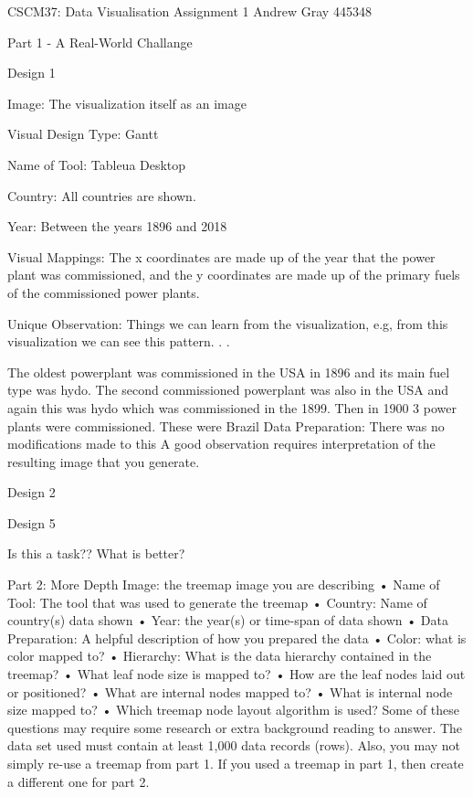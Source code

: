 CSCM37: Data Visualisation
Assignment 1
Andrew Gray
445348


Part 1 - A Real-World Challange 


Design 1

Image: The visualization itself as an image
 
Visual Design Type: Gantt

Name of Tool: Tableua Desktop

Country: All countries are shown.

Year: Between the years 1896 and 2018

Visual Mappings: The x coordinates are made up of the year that the power plant was commissioned, and the y coordinates are made up of the primary fuels of the commissioned power plants. 



Unique Observation: Things we can learn from the visualization, e.g, from this visualization we can see this pattern. . .

The oldest powerplant was commissioned in the USA in 1896 and its main fuel type was hydo. The second commissioned powerplant was also in the USA and again this was hydo which was commissioned in the 1899. Then in 1900 3 power plants were commissioned. These were Brazil
Data Preparation: There was no modifications made to this  
A good observation requires interpretation of the resulting image that you generate. 

Design 2

 




Design 5



Is this a task?? 
What is better? 


Part 2: More Depth 
Image: the treemap image you are describing
• Name of Tool: The tool that was used to generate the treemap
• Country: Name of country(s) data shown
• Year: the year(s) or time-span of data shown
• Data Preparation: A helpful description of how you prepared the data • Color: what is color mapped to?
• Hierarchy: What is the data hierarchy contained in the treemap?
• What leaf node size is mapped to?
• How are the leaf nodes laid out or positioned?
• What are internal nodes mapped to?
• What is internal node size mapped to?
• Which treemap node layout algorithm is used? 
Some of these questions may require some research or extra background reading to answer. The data set used must contain at least 1,000 data records (rows). Also, you may not simply re-use a treemap from part 1. If you used a treemap in part 1, then create a different one for part 2. 

